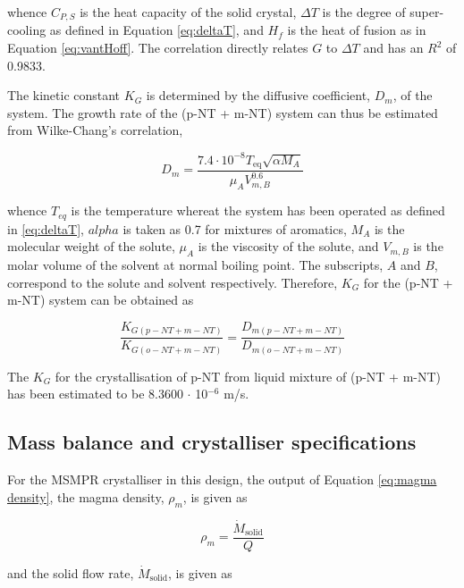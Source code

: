 \noindent whence $C_{P,S}$ is the heat capacity of the solid crystal, $\Delta T$ is the degree of super-cooling as defined in Equation \ref{eq:deltaT}, and $H_{f}$ is the heat of fusion as in Equation \ref{eq:vantHoff}. The correlation directly relates $G$ to $\Delta T$ and has an $R^2$ of 0.9833.

The kinetic constant $K_G$ is determined by the diffusive coefficient, $D_m$, of the system. The growth rate of the (p-NT + m-NT) system can thus be estimated from Wilke-Chang's correlation, \cite{miyabe_estimation_2011}

\begin{equation}
    D_m = \frac{7.4 \cdot 10^{-8} T_{\mathrm{eq}} \sqrt{\alpha M_A}}{\mu_A V_{m,B}^0.6}
\end{equation}

\noindent whence $T_{eq}$ is the temperature whereat the system has been operated as defined in \ref{eq:deltaT}, $alpha$ is taken as 0.7 for mixtures of aromatics, $M_A$ is the molecular weight of the solute, $\mu_A$ is the viscosity of the solute, and $V_{m,B}$ is the molar volume of the solvent at normal boiling point. The subscripts, $A$ and $B$, correspond to the solute and solvent respectively. Therefore, $K_G$ for the (p-NT + m-NT) system can be obtained as 

\begin{equation} \label{eq:ratio of growth kinetics}
    \frac{K_{G(p-NT + m-NT)}}{K_{G(o-NT + m-NT)}} = \frac{D_{m(p-NT + m-NT)}}{D_{m(o-NT + m-NT)}}
\end{equation}

\noindent The $K_G$ for the crystallisation of p-NT from liquid mixture of (p-NT + m-NT) has been estimated to be 8.3600 $\cdot$ 10$^{-6}$ m/s. 

\subsection{Mass balance and crystalliser specifications} \label{sec: crystalliser mass balance}

For the MSMPR crystalliser in this design, the output of Equation \ref{eq:magma density}, the magma density, $\rho_m$, is given as 

\begin{equation}
    \rho_m = \frac{\dot{M}_{\mathrm{solid}}}{Q}
\end{equation}

\noindent and the solid flow rate, $\dot{M}_{\mathrm{solid}}$, is given as

